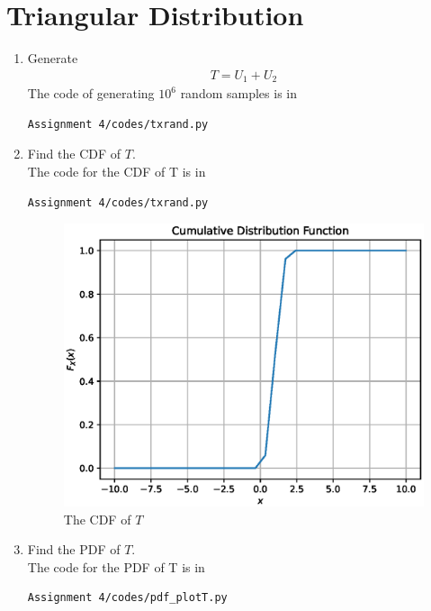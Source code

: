 \documentclass[journal,12pt,twocolumn]{IEEEtran}
\renewcommand\thesection{\arabic{section}}
\begin{document}
\section{Triangular Distribution}
\begin{enumerate}[label=\thesection.\arabic*
,ref=\thesection.\theenumi]
%
\item Generate 
	\begin{align}
		T = U_1+U_2
	\end{align}
\solution
The code of generating $10^6$ random samples is in
\begin{lstlisting}
Assignment 4/codes/txrand.py
\end{lstlisting}
\item Find the CDF of $T$.\\
\solution
The code for the CDF of T is in
\begin{lstlisting}
Assignment 4/codes/txrand.py
\end{lstlisting}
\begin{figure}
\centering
\includegraphics[width=\columnwidth]{./figs/t_cdf.eps}
\caption{The CDF of $T$}
\label{fig:t_cdf}
\end{figure}
\item Find the PDF of $T$.\\
\solution
The code for the PDF of T is in
\begin{lstlisting}
Assignment 4/codes/pdf_plotT.py
\end{lstlisting}
\begin{figure}
\centering

\end{figure}
\end{enumerate}
\end{document}

